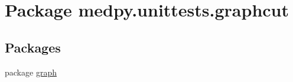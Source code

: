 \hypertarget{namespacemedpy_1_1unittests_1_1graphcut}{
\section{Package medpy.unittests.graphcut}
\label{namespacemedpy_1_1unittests_1_1graphcut}
}
\subsection*{Packages}
\begin{DoxyCompactItemize}
\item 
package \hyperlink{namespacemedpy_1_1unittests_1_1graphcut_1_1graph}{graph}
\end{DoxyCompactItemize}
